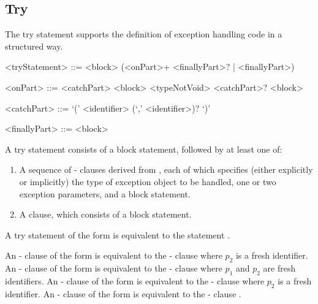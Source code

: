 \documentclass[makeidx]{article}
\begin{document}
\subsection{Try}

\LMHash{}%
The try statement supports the definition of exception handling code
in a structured way.

\begin{grammar}
<tryStatement> ::= \TRY{} <block> (<onPart>+ <finallyPart>? | <finallyPart>)

<onPart> ::= <catchPart> <block>
  \alt \ON{} <typeNotVoid> <catchPart>? <block>

<catchPart> ::= \CATCH{} `(' <identifier> (`,' <identifier>)? `)'

<finallyPart> ::= \FINALLY{} <block>
\end{grammar}

\LMHash{}%
A try statement consists of a block statement, followed by at least one of:
\begin{enumerate}
\item
  A sequence of \ON-\CATCH{} clauses derived from ,
  each of which specifies
  (either explicitly or implicitly)
  the type of exception object to be handled,
  one or two exception parameters,
  and a block statement.
\item
  A \FINALLY{} clause, which consists of a block statement.
\end{enumerate}

\LMHash{}%
A try statement of the form
is equivalent to the statement
.

\LMHash{}%
An \ON-\CATCH{} clause of the form
is equivalent to the \ON-\CATCH{} clause
where $p_2$ is a fresh identifier.
%
An \ON-\CATCH{} clause of the form
is equivalent to the \ON-\CATCH{} clause
where $p_1$ and $p_2$ are fresh identifiers.
%
An \ON-\CATCH{} clause of the form
is equivalent to the \ON-\CATCH{} clause
where $p_2$ is a fresh identifier.
%
An \ON-\CATCH{} clause of the form
is equivalent to the \ON-\CATCH{} clause
.
\end{document}
